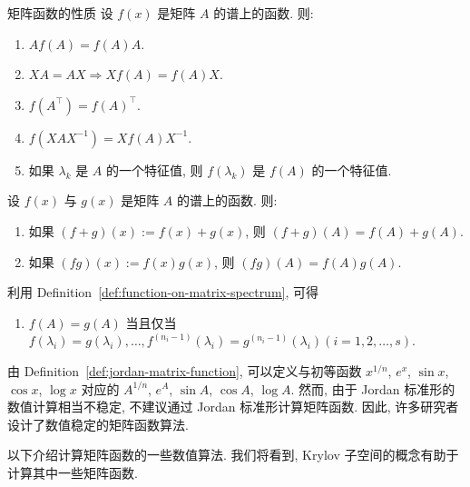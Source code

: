 \begin{Theorem}{{矩阵函数的性质}}\label{thm:matrix-function-properties}
{设 $f(x)$ 是矩阵 $A$ 的谱上的函数. 则:}
\begin{enumerate}[label=(\arabic*)]
\item $Af(A)=f(A)A$.
\item $XA=AX\Rightarrow Xf(A)=f(A)X$.
\item $f(A^{\top})=f(A)^{\top}$.
\item $f(XAX^{-1})=Xf(A)X^{-1}$.
\item {如果 $\lambda_k$ 是 $A$ 的一个特征值, 则 $f(\lambda_k)$ 是 $f(A)$ 的一个特征值.}
\end{enumerate}
{设 $f(x)$ 与 $g(x)$ 是矩阵 $A$ 的谱上的函数. 则:}
\begin{enumerate}[label=(\arabic*),start=6]
\item {如果 $(f+g)(x):=f(x)+g(x)$, 则 $(f+g)(A)=f(A)+g(A)$.}
\item {如果 $(fg)(x):=f(x)g(x)$, 则 $(fg)(A)=f(A)g(A)$.}
\end{enumerate}
{利用 Definition~\ref{def:function-on-matrix-spectrum}, 可得}
\begin{enumerate}[label=(\arabic*),start=8]
\item {$f(A)=g(A)$ 当且仅当\newline{}$f(\lambda_i)=g(\lambda_i),\ldots,f^{(n_i-1)}(\lambda_i)=g^{(n_i-1)}(\lambda_i)$\newline{}$(i=1,2,\ldots,s)$.}
\end{enumerate}
\end{Theorem}

{由 Definition~\ref{def:jordan-matrix-function}, 可以定义与初等函数 $x^{1/n}$, $e^x$, $\sin x$, $\cos x$, $\log x$ 对应的 $A^{1/n}$, $e^A$, $\sin A$, $\cos A$, $\log A$. 然而, 由于 Jordan 标准形的数值计算相当不稳定, 不建议通过 Jordan 标准形计算矩阵函数. 因此, 许多研究者设计了数值稳定的矩阵函数算法.}

{以下介绍计算矩阵函数的一些数值算法. 我们将看到, Krylov 子空间的概念有助于计算其中一些矩阵函数.}
